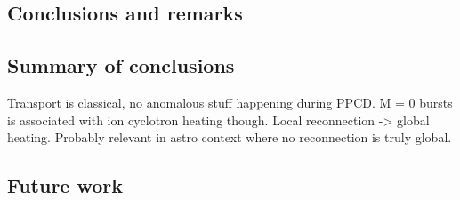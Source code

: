 \begin{refsection}


\chapter{Conclusions and remarks}

\section{Summary of conclusions}

Transport is classical, no anomalous stuff happening during PPCD. M = 0 bursts is associated with ion cyclotron heating though. Local reconnection -> global heating. Probably relevant in astro context where no reconnection is truly global. 

\section{Future work}


\printbibliography
\end{refsection}